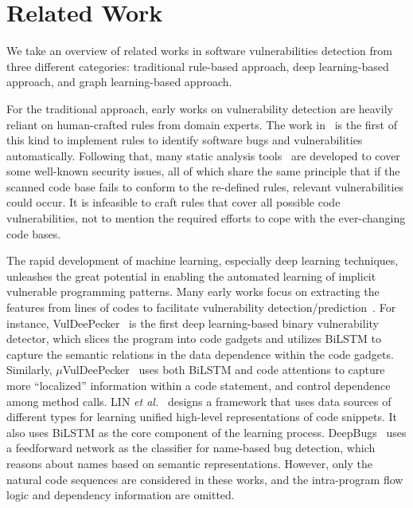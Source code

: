 \section{Related Work}
\label{sec:related}

We take an overview of related works in software vulnerabilities detection from three different categories: 
traditional rule-based approach, deep learning-based approach, and graph learning-based approach. 

For the traditional approach, early works on vulnerability detection are heavily reliant on human-crafted rules from domain experts. 
The work in~\cite{engler2001bugs} is the first of this kind to implement rules to identify software bugs and vulnerabilities automatically. 
Following that, many static analysis tools~\cite{ferschke2012flawfinder,viega2001static,kremenek2008finding, bader2019getafix, caitlin2015tricorder} 
are developed to cover some well-known security issues, all of which share the same principle 
that if the scanned code base fails to conform to the re-defined rules, 
relevant vulnerabilities could occur. 
It is infeasible to craft rules that cover all possible code vulnerabilities, 
not to mention the required efforts to cope with the ever-changing code bases.

The rapid development of machine learning, especially deep learning techniques, 
unleashes the great potential in enabling the automated learning of implicit vulnerable programming patterns. 
Many early works focus on extracting the features from lines of codes to 
facilitate vulnerability detection/prediction~\cite{chowdhury2011using,shin2010evaluating,chernis2018machine}. 
For instance, 
VulDeePecker~\cite{li2018vuldeepecker} is the first deep learning-based binary vulnerability detector, 
which slices the program into code gadgets and utilizes BiLSTM to capture the semantic relations in the data dependence within the code gadgets. 
%
Similarly, $\mu$VulDeePecker~\cite{zou2019mu} uses both BiLSTM and code attentions to capture more ``localized'' information within a code statement, 
and control dependence among method calls. 
%
LIN \textit{et al.}~\cite{lin} designs a framework that uses data sources of different types for learning unified high-level representations of code snippets. 
It also uses BiLSTM as the core component of the learning process. 
%
DeepBugs~\cite{pradel2018deepbugs} uses a feedforward network as the classifier for name-based bug detection, 
which reasons about names based on semantic representations. 
However, only the natural code sequences are considered in these works, 
and the intra-program flow logic and dependency information are omitted. 


